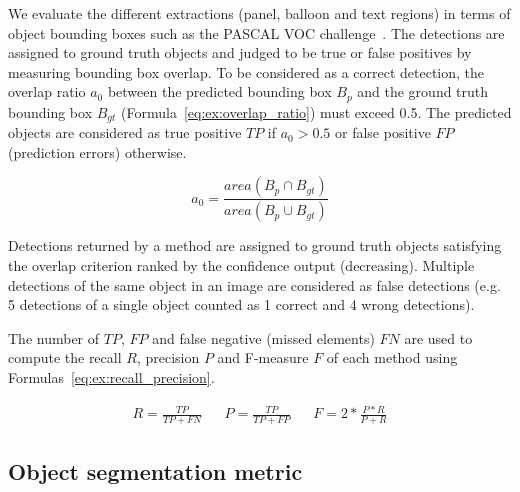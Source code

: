 We evaluate the different extractions (panel, balloon and text regions) in terms of object bounding boxes such as the PASCAL VOC challenge~\cite{everingham2010pascal}.
The detections are assigned to ground truth objects and judged to be true or false positives by measuring bounding box overlap.
To be considered as a correct detection, the overlap ratio $a_0$ between the predicted bounding box $B_p$ and the ground truth bounding box $B_{gt}$ (Formula~\ref{eq:ex:overlap_ratio}) must exceed 0.5.
The predicted objects are considered as true positive $TP$ if $a_0 > 0.5$ or false positive $FP$ (prediction errors) otherwise.

\begin{equation}
\label{eq:ex:overlap_ratio}
  a_0 = \frac{area(B_p \cap B_{gt})}{area(B_p \cup B_{gt})}
\end{equation}

Detections returned by a method are assigned to ground truth objects satisfying the overlap criterion ranked by the confidence output (decreasing).
Multiple detections of the same object in an image are considered as false detections (e.g. 5 detections of a single object counted as 1 correct and 4 wrong detections).

The number of $TP$, $FP$ and false negative (missed elements) $FN$ are used to compute the recall $R$, precision $P$ and F-measure $F$ of each method using Formulas~\ref{eq:ex:recall_precision}.

\begin{align}
\label{eq:ex:recall_precision}
R = \frac{TP}{TP + FN} && P = \frac{TP}{TP + FP} && F = 2 * \frac{P * R}{P + R}
\end{align}




\subsection{Object segmentation metric} %
\label{sub:ex:object_segmentation_metric}

